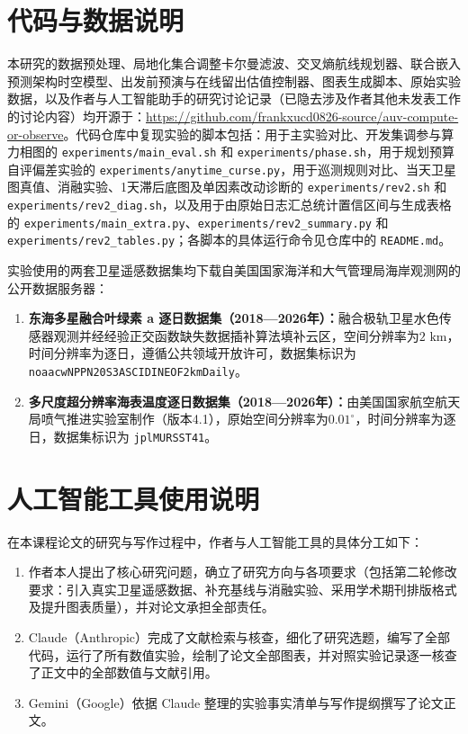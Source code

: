 \section{代码与数据说明}

本研究的数据预处理、局地化集合调整卡尔曼滤波、交叉熵航线规划器、联合嵌入预测架构时空模型、出发前预演与在线留出估值控制器、图表生成脚本、原始实验数据，以及作者与人工智能助手的研究讨论记录（已隐去涉及作者其他未发表工作的讨论内容）均开源于：\url{https://github.com/frankxucd0826-source/auv-compute-or-observe}。代码仓库中复现实验的脚本包括：用于主实验对比、开发集调参与算力相图的 \texttt{experiments/main\_eval.sh} 和 \texttt{experiments/phase.sh}，用于规划预算自评偏差实验的 \texttt{experiments/anytime\_curse.py}，用于巡测规则对比、当天卫星图真值、消融实验、1天滞后底图及单因素改动诊断的 \texttt{experiments/rev2.sh} 和 \texttt{experiments/rev2\_diag.sh}，以及用于由原始日志汇总统计置信区间与生成表格的 \texttt{experiments/main\_extra.py}、\texttt{experiments/rev2\_summary.py} 和 \texttt{experiments/rev2\_tables.py}；各脚本的具体运行命令见仓库中的 \texttt{README.md}。

实验使用的两套卫星遥感数据集均下载自美国国家海洋和大气管理局海岸观测网的公开数据服务器：
\begin{enumerate}
  \item \textbf{东海多星融合叶绿素 a 逐日数据集（2018—2026年）：}融合极轨卫星水色传感器观测并经经验正交函数缺失数据插补算法填补云区，空间分辨率为$2\text{ km}$，时间分辨率为逐日，遵循公共领域开放许可，数据集标识为 \texttt{noaacwNPPN20S3ASCIDINEOF2kmDaily}。
  \item \textbf{多尺度超分辨率海表温度逐日数据集（2018—2026年）：}由美国国家航空航天局喷气推进实验室制作（版本4.1），原始空间分辨率为$0.01^\circ$，时间分辨率为逐日，数据集标识为 \texttt{jplMURSST41}。
\end{enumerate}

\section{人工智能工具使用说明}

在本课程论文的研究与写作过程中，作者与人工智能工具的具体分工如下：
\begin{enumerate}
  \item 作者本人提出了核心研究问题，确立了研究方向与各项要求（包括第二轮修改要求：引入真实卫星遥感数据、补充基线与消融实验、采用学术期刊排版格式及提升图表质量），并对论文承担全部责任。
  \item Claude（Anthropic）完成了文献检索与核查，细化了研究选题，编写了全部代码，运行了所有数值实验，绘制了论文全部图表，并对照实验记录逐一核查了正文中的全部数值与文献引用。
  \item Gemini（Google）依据 Claude 整理的实验事实清单与写作提纲撰写了论文正文。
\end{enumerate}
